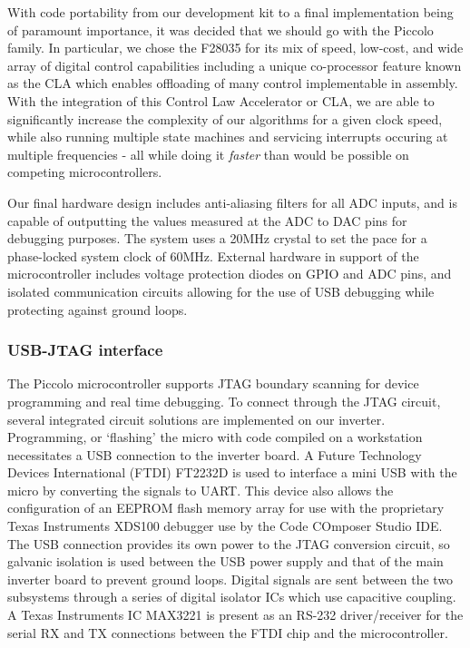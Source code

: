 With code portability from our development kit to a final implementation being of paramount importance, it was decided that we should go with the Piccolo family. In particular, we chose the F28035 for its mix of speed, low-cost, and wide array of digital control capabilities including a unique co-processor feature known as the CLA which enables offloading of many control implementable in assembly. With the integration of this Control Law Accelerator or CLA, we are able to significantly increase the complexity of our algorithms for a given clock speed, while also running multiple state machines and servicing interrupts occuring at multiple frequencies - all while doing it \emph{faster} than would be possible on competing microcontrollers.

Our final hardware design includes anti-aliasing filters for all ADC inputs, and is capable of outputting the values measured at the ADC to DAC pins for debugging purposes. The system uses a 20MHz crystal to set the pace for a phase-locked system clock of 60MHz. External hardware in support of the microcontroller includes voltage protection diodes on GPIO and ADC pins, and isolated communication circuits allowing for the use of USB debugging while protecting against ground loops.

\subsubsection{USB-JTAG interface}
The Piccolo microcontroller supports JTAG boundary scanning for device programming and real time debugging. To connect through the JTAG circuit, several integrated circuit solutions are implemented on our inverter. Programming, or 
`flashing' the micro with code compiled on a workstation necessitates a USB connection to the inverter board. A Future Technology Devices International (FTDI) FT2232D is used to interface a mini USB with the micro by converting the signals to UART. This device also allows the configuration of an EEPROM flash memory array for use with the proprietary Texas Instruments XDS100 debugger use by the Code COmposer Studio IDE. The USB connection provides its own power to the JTAG conversion circuit, so galvanic isolation is used between the USB power supply and that of the main inverter board to prevent ground loops. Digital signals are sent between the two subsystems through a series of digital isolator ICs which use capacitive coupling. A Texas Instruments IC MAX3221 is present as an RS-232 driver/receiver for the serial RX and TX connections between the FTDI chip and the microcontroller.

